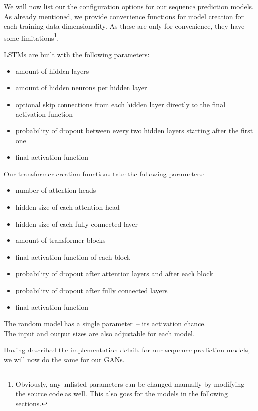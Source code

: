 We will now list our the configuration options for our sequence
prediction models. As already mentioned, we provide convenience
functions for model creation for each training data dimensionality. As
these are only for convenience, they have some
limitations\footnote{Obviously, any unlisted parameters can be changed
  manually by modifying the source code as well. This also goes for
  the models in the following sections.}.

LSTMs are built with the following parameters:
\begin{itemize}
\item amount of hidden layers
\item amount of hidden neurons per hidden layer
\item optional skip connections from each hidden layer directly to the
  final activation function
\item probability of dropout between every two hidden layers starting
  after the first one
\item final activation function
\end{itemize}
Our transformer creation functions take the following parameters:
\begin{itemize}
\item number of attention heads
\item hidden size of each attention head
\item hidden size of each fully connected layer
\item amount of transformer blocks
\item final activation function of each block
\item probability of dropout after attention layers and after each
  block
\item probability of dropout after fully connected layers
\item final activation function
\end{itemize}
The random model has a single parameter~-- its activation chance. \\
The input and output sizes are also adjustable for each model.

Having described the implementation details for our sequence
prediction models, we will now do the same for our GANs.


